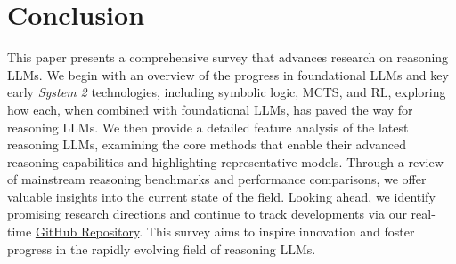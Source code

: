 
\section{Conclusion}\label{conclusion}




This paper presents a comprehensive survey that advances research on reasoning LLMs. 
We begin with an overview of the progress in foundational LLMs and key early \textit{System 2} technologies, including symbolic logic, MCTS, and RL, exploring how each, when combined with foundational LLMs, has paved the way for reasoning LLMs. 
We then provide a detailed feature analysis of the latest reasoning LLMs, examining the core methods that enable their advanced reasoning capabilities and highlighting representative models. 
Through a review of mainstream reasoning benchmarks and performance comparisons, we offer valuable insights into the current state of the field. 
Looking ahead, we identify promising research directions and continue to track developments via our real-time \href{https://github.com/zzli2022/Awesome-Slow-Reason-System}{GitHub Repository}. 
This survey aims to inspire innovation and foster progress in the rapidly evolving field of reasoning LLMs.